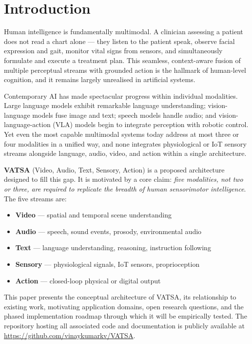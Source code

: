 \documentclass[11pt,a4paper]{article}
\begin{document}
\section{Introduction}
\label{sec:intro}

Human intelligence is fundamentally multimodal.  A clinician assessing a patient does
not read a chart alone --- they listen to the patient speak, observe facial expression
and gait, monitor vital signs from sensors, and simultaneously formulate and execute
a treatment plan.  This seamless, context-aware fusion of multiple perceptual streams
with grounded action is the hallmark of human-level cognition, and it remains largely
unrealised in artificial systems.

Contemporary AI has made spectacular progress within individual modalities.  Large
language models \citep{vaswani2017attention} exhibit remarkable language
understanding; vision-language models \citep{radford2021clip,alayrac2022flamingo}
fuse image and text; speech models handle audio; and vision-language-action (VLA)
models \citep{ma2024vla} begin to integrate perception with robotic control.  Yet even
the most capable multimodal systems today address at most three or four modalities in a
unified way, and none integrates physiological or IoT sensory streams alongside
language, audio, video, and action within a single architecture.

\textbf{VATSA} (Video, Audio, Text, Sensory, Action) is a proposed architecture
designed to fill this gap.  It is motivated by a core claim: \emph{five modalities, not
two or three, are required to replicate the breadth of human sensorimotor
intelligence}.  The five streams are:

\begin{itemize}[leftmargin=2em]
  \item \textbf{Video} --- spatial and temporal scene understanding
  \item \textbf{Audio} --- speech, sound events, prosody, environmental audio
  \item \textbf{Text}  --- language understanding, reasoning, instruction following
  \item \textbf{Sensory} --- physiological signals, IoT sensors, proprioception
  \item \textbf{Action} --- closed-loop physical or digital output
\end{itemize}

This paper presents the conceptual architecture of VATSA, its relationship to existing
work, motivating application domains, open research questions, and the phased
implementation roadmap through which it will be empirically tested.  The repository
hosting all associated code and documentation is publicly available at
\url{https://github.com/vinaykumarkv/VATSA}.
\end{document}
